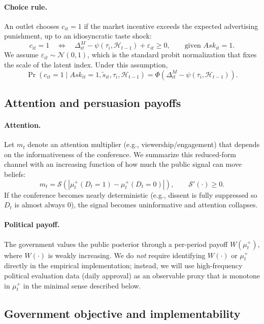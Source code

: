 \documentclass[12pt]{article}
\begin{document}
\paragraph{Choice rule.}
An outlet chooses $c_{it}=1$ if the market incentive exceeds the expected advertising punishment, up to an idiosyncratic taste shock:
\[
c_{it}=1
\quad\Longleftrightarrow\quad
\Delta^{M}_{it}-\psi(\tau_i,\mathcal{H}_{t-1})+\varepsilon_{it}\ge 0,
\qquad\text{given } Ask_{it}=1.
\]
We assume $\varepsilon_{it}\sim \mathcal{N}(0,1)$, which is the standard probit normalization that fixes the scale of the latent index. Under this assumption,
\begin{equation}\label{eq:prob_crit}
\Pr(c_{it}=1\mid Ask_{it}=1,\tilde{s}_{it},\tau_i,\mathcal{H}_{t-1})
=
\Phi\!\left(\Delta^{M}_{it}-\psi(\tau_i,\mathcal{H}_{t-1})\right).
\end{equation}

\subsection{Attention and persuasion payoffs}

\paragraph{Attention.}
Let $m_t$ denote an attention multiplier (e.g., viewership/engagement) that depends on the informativeness of the conference. We summarize this reduced-form channel with an increasing function of how much the public signal can move beliefs:
\[
m_t=\mathcal{S}\!\left(\left|\mu_t^+(D_t=1)-\mu_t^+(D_t=0)\right|\right),
\qquad \mathcal{S}'(\cdot)\ge 0.
\]
If the conference becomes nearly deterministic (e.g., dissent is fully suppressed so $D_t$ is almost always $0$), the signal becomes uninformative and attention collapses.

\paragraph{Political payoff.}
The government values the public posterior through a per-period payoff $W(\mu_t^+)$, where $W(\cdot)$ is weakly increasing. We do \emph{not} require identifying $W(\cdot)$ or $\mu_t^+$ directly in the empirical implementation; instead, we will use high-frequency political evaluation data (daily approval) as an observable proxy that is monotone in $\mu_t^+$ in the minimal sense described below.

\subsection{Government objective and implementability}
\end{document}
